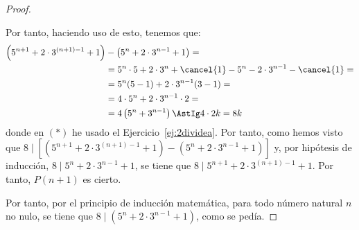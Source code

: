 \begin{ejercicio}
\begin{proof}
\begin{itemize}
                Por tanto, haciendo uso de esto, tenemos que:
                \begin{align*}
                    \left(5^{n+1} + 2\cdot 3^{(n+1)-1}+1\right) &- \left(5^n + 2\cdot 3^{n-1}+1\right) =\\
                    &= 5^n\cdot 5 + 2\cdot 3^{n}+\cancel{1} - 5^n - 2\cdot 3^{n-1} - \cancel{1} =\\
                    &= 5^n(5-1)+2\cdot 3^{n-1}(3-1) =\\
                    &= 4\cdot 5^n + 2\cdot 3^{n-1}\cdot 2 =\\
                    &= 4\left(5^n + 3^{n-1}\right)
                    \AstIg 4\cdot 2k = 8k
                \end{align*}
                donde en $(\ast)$ he usado el Ejercicio~\ref{ej:2dividea}.
                Por tanto, como hemos visto que $8\mid \left[\left(5^{n+1} + 2\cdot 3^{(n+1)-1}+1\right) - \left(5^n + 2\cdot 3^{n-1}+1\right)\right]$ y, por hipótesis de inducción, $8\mid 5^n + 2\cdot 3^{n-1}+1$, se tiene que $8\mid 5^{n+1} + 2\cdot 3^{(n+1)-1}+1$.
                Por tanto, $P(n+1)$ es cierto.
            \end{itemize}
            Por tanto, por el principio de inducción matemática, para todo número natural $n$ no nulo, se tiene que $8\mid \left(5^n + 2\cdot 3^{n-1}+1\right)$, como se pedía.
    \end{proof}
\end{ejercicio}

